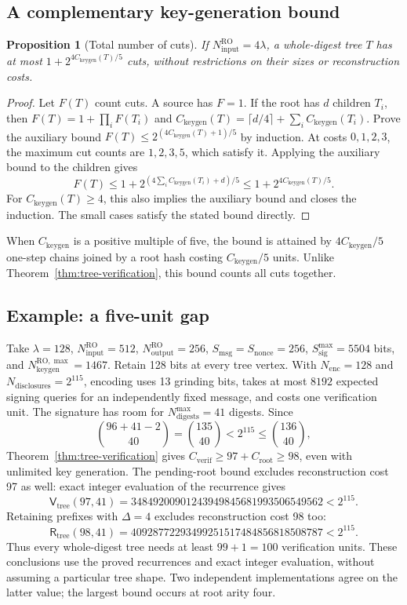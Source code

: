 \documentclass[10pt]{article}
\newtheorem{proposition}{Proposition}
\newcommand{\roinput}{N_{\mathrm{input}}^{\mathrm{RO}}}
\newcommand{\rooutput}{N_{\mathrm{output}}^{\mathrm{RO}}}
\newcommand{\keybudget}{N_{\mathrm{keygen}}^{\mathrm{RO},\max}}
\newcommand{\sigbudget}{S_{\mathrm{sig}}^{\max}}
\newcommand{\messagesize}{S_{\mathrm{msg}}}
\newcommand{\noncesize}{S_{\mathrm{nonce}}}
\newcommand{\encbits}{N_{\mathrm{enc}}}
\newcommand{\disclosurecount}{N_{\mathrm{disclosures}}}
\newcommand{\digestbudget}{N_{\mathrm{digests}}^{\max}}
\begin{document}
\subsection{A complementary key-generation bound}
\begin{proposition}[Total number of cuts]
If $\roinput=4\lambda$, a whole-digest tree $T$ has at most $1+2^{4C_{\mathrm{keygen}}(T)/5}$ cuts, without restrictions on their sizes or reconstruction costs.
\end{proposition}
\begin{proof}
Let $F(T)$ count cuts. A source has $F=1$. If the root has $d$ children $T_i$, then $F(T)=1+\prod_i F(T_i)$ and $C_{\mathrm{keygen}}(T)=\lceil d/4\rceil+\sum_i C_{\mathrm{keygen}}(T_i)$. Prove the auxiliary bound $F(T)\le2^{(4C_{\mathrm{keygen}}(T)+1)/5}$ by induction. At costs $0,1,2,3$, the maximum cut counts are $1,2,3,5$, which satisfy it. Applying the auxiliary bound to the children gives
\[
 F(T)\le1+2^{(4\sum_i C_{\mathrm{keygen}}(T_i)+d)/5}\le1+2^{4C_{\mathrm{keygen}}(T)/5}.
\]
For $C_{\mathrm{keygen}}(T)\ge4$, this also implies the auxiliary bound and closes the induction. The small cases satisfy the stated bound directly.
\end{proof}
When $C_{\mathrm{keygen}}$ is a positive multiple of five, the bound is attained by $4C_{\mathrm{keygen}}/5$ one-step chains joined by a root hash costing $C_{\mathrm{keygen}}/5$ units. Unlike Theorem~\ref{thm:tree-verification}, this bound counts all cuts together.

\subsection{Example: a five-unit gap}
Take $\lambda=128$, $\roinput=512$, $\rooutput=256$, $\messagesize=\noncesize=256$, $\sigbudget=5504$ bits, and $\keybudget=1467$. Retain 128 bits at every tree vertex. With $\encbits=128$ and $\disclosurecount=2^{115}$, encoding uses 13 grinding bits, takes at most $8192$ expected signing queries for an independently fixed message, and costs one verification unit. The signature has room for $\digestbudget=41$ digests. Since
\[
 \binom{96+41-2}{40}=\binom{135}{40}<2^{115}\le\binom{136}{40},
\]
Theorem~\ref{thm:tree-verification} gives $C_{\mathrm{verif}}\ge97+C_{\mathrm{root}}\ge98$, even with unlimited key generation. The pending-root bound excludes reconstruction cost 97 as well: exact integer evaluation of the recurrence gives
\[
 \mathsf V_{\mathrm{tree}}(97,41)=34849200901243949845681993506549562<2^{115}.
\]
Retaining prefixes with $\Delta=4$ excludes reconstruction cost 98 too:
\[
 \mathsf R_{\mathrm{tree}}(98,41)=40928772293499251517484856818508787<2^{115}.
\]
Thus every whole-digest tree needs at least $99+1=100$ verification units. These conclusions use the proved recurrences and exact integer evaluation, without assuming a particular tree shape. Two independent implementations agree on the latter value; the largest bound occurs at root arity four.
\end{document}
